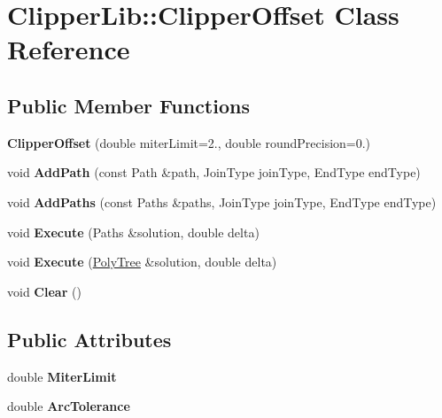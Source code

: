 \hypertarget{class_clipper_lib_1_1_clipper_offset}{}\section{Clipper\+Lib\+:\+:Clipper\+Offset Class Reference}
\label{class_clipper_lib_1_1_clipper_offset}
\subsection*{Public Member Functions}
\begin{DoxyCompactItemize}
\item 
\mbox{\label{class_clipper_lib_1_1_clipper_offset_a45b4750989901db0c3865c374abdfcdc}} 
{\bfseries Clipper\+Offset} (double miter\+Limit=2., double round\+Precision=0.)
\item 
\mbox{\label{class_clipper_lib_1_1_clipper_offset_a0cd68e3690072f510924a5b25291043b}} 
void {\bfseries Add\+Path} (const Path \&path, Join\+Type join\+Type, End\+Type end\+Type)
\item 
\mbox{\label{class_clipper_lib_1_1_clipper_offset_a18b35198f6370d76885af995ee2f16cb}} 
void {\bfseries Add\+Paths} (const Paths \&paths, Join\+Type join\+Type, End\+Type end\+Type)
\item 
\mbox{\label{class_clipper_lib_1_1_clipper_offset_ac591b25e483a52c99c3190a256ad4589}} 
void {\bfseries Execute} (Paths \&solution, double delta)
\item 
\mbox{\label{class_clipper_lib_1_1_clipper_offset_a3aaa9fcc20e503c967a23f1793536118}} 
void {\bfseries Execute} (\mbox{\hyperlink{class_clipper_lib_1_1_poly_tree}{Poly\+Tree}} \&solution, double delta)
\item 
\mbox{\label{class_clipper_lib_1_1_clipper_offset_ab444433587b6a3f6c89655938d889c7d}} 
void {\bfseries Clear} ()
\end{DoxyCompactItemize}
\subsection*{Public Attributes}
\begin{DoxyCompactItemize}
\item 
\mbox{\label{class_clipper_lib_1_1_clipper_offset_a36b3bf4571e5b831edd584cbcb179246}} 
double {\bfseries Miter\+Limit}
\item 
\mbox{\label{class_clipper_lib_1_1_clipper_offset_a6c1735720b06e6b92dc25891014b2a92}} 
double {\bfseries Arc\+Tolerance}
\end{DoxyCompactItemize}


